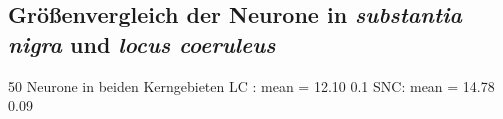 \documentclass[12pt,a4paper,pdftex]{article}
\newcommand{\rpm}{\raisebox{.2ex}{$\scriptstyle\pm$} }
\begin{document}
\subsection{Größenvergleich der Neurone in \textit{substantia nigra} und \textit{locus coeruleus}}

50 Neurone in beiden Kerngebieten
LC : mean = 12.10 \rpm 0.1
SNC: mean = 14.78 \rpm 0.09




\newpage



\printindex
\end{document}
